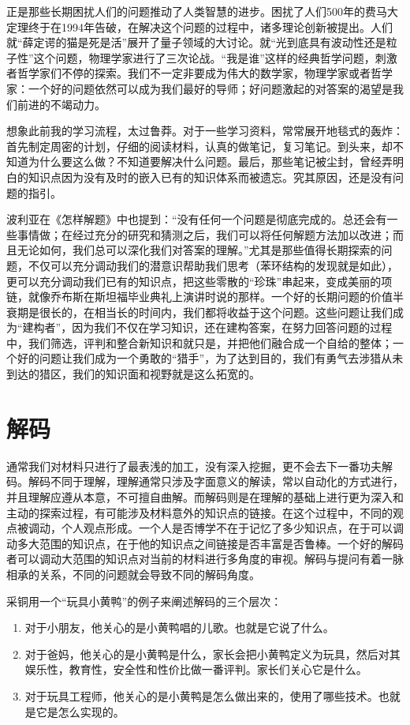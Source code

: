 \documentclass[10pt,a4paper,UTF8]{article}
\begin{document}
正是那些长期困扰人们的问题推动了人类智慧的进步。困扰了人们500年的费马大定理终于在1994年告破，在解决这个问题的过程中，诸多理论创新被提出。人们就“薛定谔的猫是死是活”展开了量子领域的大讨论。就“光到底具有波动性还是粒子性”这个问题，物理学家进行了三次论战。“我是谁”这样的经典哲学问题，刺激者哲学家们不停的探索。我们不一定非要成为伟大的数学家，物理学家或者哲学家：一个好的问题依然可以成为我们最好的导师；好问题激起的对答案的渴望是我们前进的不竭动力。

想象此前我的学习流程，太过鲁莽。对于一些学习资料，常常展开地毯式的轰炸：首先制定周密的计划，仔细的阅读材料，认真的做笔记，复习笔记。到头来，却不知道为什么要这么做？不知道要解决什么问题。最后，那些笔记被尘封，曾经弄明白的知识点因为没有及时的嵌入已有的知识体系而被遗忘。究其原因，还是没有问题的指引。

波利亚在《怎样解题》中也提到：“没有任何一个问题是彻底完成的。总还会有一些事情做；在经过充分的研究和猜测之后，我们可以将任何解题方法加以改进；而且无论如何，我们总可以深化我们对答案的理解。”尤其是那些值得长期探索的问题，不仅可以充分调动我们的潜意识帮助我们思考（苯环结构的发现就是如此），更可以充分调动我们已有的知识点，把这些零散的“珍珠”串起来，变成美丽的项链，就像乔布斯在斯坦福毕业典礼上演讲时说的那样。一个好的长期问题的价值半衰期是很长的，在相当长的时间内，我们都将收益于这个问题。这些问题让我们成为“建构者”，因为我们不仅在学习知识，还在建构答案，在努力回答问题的过程中，我们筛选，评判和整合新知识和就只是，并把他们融合成一个自给的整体；一个好的问题让我们成为一个勇敢的“猎手”，为了达到目的，我们有勇气去涉猎从未到达的猎区，我们的知识面和视野就是这么拓宽的。

\section{解码}
\label{sec:orgheadline4}



通常我们对材料只进行了最表浅的加工，没有深入挖掘，更不会去下一番功夫解码。解码不同于理解，理解通常只涉及字面意义的解读，常以自动化的方式进行，并且理解应遵从本意，不可擅自曲解。而解码则是在理解的基础上进行更为深入和主动的探索过程，有可能涉及材料意外的知识点的链接。在这个过程中，不同的观点被调动，个人观点形成。一个人是否博学不在于记忆了多少知识点，在于可以调动多大范围的知识点，在于他的知识点之间链接是否丰富是否鲁棒。一个好的解码者可以调动大范围的知识点对当前的材料进行多角度的审视。解码与提问有着一脉相承的关系，不同的问题就会导致不同的解码角度。

采铜用一个“玩具小黄鸭”的例子来阐述解码的三个层次：
\begin{enumerate}
\item 对于小朋友，他关心的是小黄鸭唱的儿歌。也就是它说了什么。
\item 对于爸妈，他关心的是小黄鸭是什么，家长会把小黄鸭定义为玩具，然后对其娱乐性，教育性，安全性和性价比做一番评判。家长们关心它是什么。
\item 对于玩具工程师，他关心的是小黄鸭是怎么做出来的，使用了哪些技术。也就是它是怎么实现的。
\end{enumerate}
\end{document}
